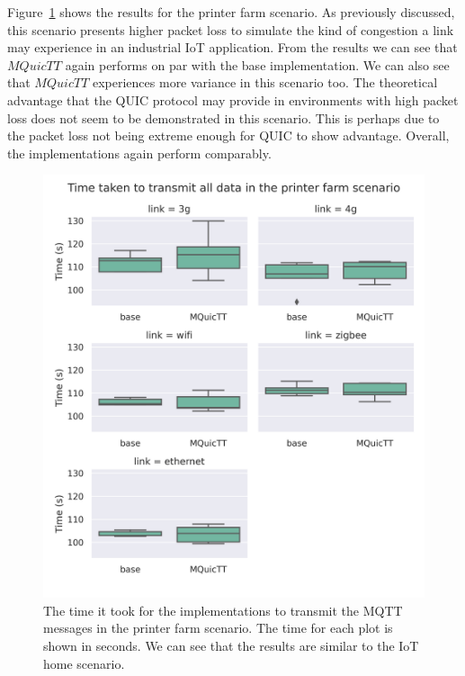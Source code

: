 Figure~\ref{fig:comm_time_farm} shows the results for the printer farm scenario.
As previously discussed, this scenario presents higher packet loss to simulate the kind of congestion a link may experience in an industrial IoT application.
From the results we can see that $MQuicTT$ again performs on par with the base implementation.
We can also see that $MQuicTT$ experiences more variance in this scenario too.
The theoretical advantage that the QUIC protocol may provide in environments with high packet loss does not seem to be demonstrated in this scenario.
This is perhaps due to the packet loss not being extreme enough for QUIC to show advantage.
Overall, the implementations again perform comparably.

\begin{figure}
    \centering
    \includegraphics[width=1\linewidth]{images/analysis_comm_time_farm.png}
    \caption{The time it took for the implementations to transmit the MQTT messages in the printer farm scenario.
        The time for each plot is shown in seconds.
        We can see that the results are similar to the IoT home scenario.}
    \label{fig:comm_time_farm}
\end{figure}

